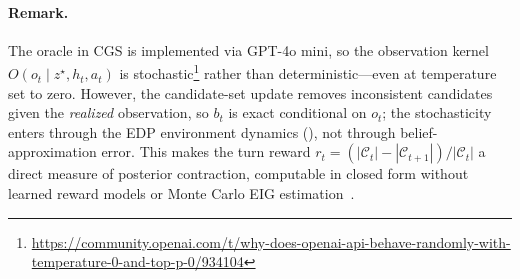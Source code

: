 \documentclass[11pt]{article}
\theoremstyle{plain}
\theoremstyle{definition}
\theoremstyle{remark}
\begin{document}
\paragraph{Remark.}
The oracle in CGS is implemented via GPT-4o mini, so the observation
kernel $O(o_t \mid z^\star, h_t, a_t)$ is stochastic\footnote{\href{https://community.openai.com/t/why-does-openai-api-behave-randomly-with-temperature-0-and-top-p-0/934104}{https://community.openai.com/t/why-does-openai-api-behave-randomly-with-temperature-0-and-top-p-0/934104}} rather than
deterministic—even at temperature set to zero. However, the candidate-set update removes
inconsistent candidates given the \emph{realized} observation, so
$b_t$ is exact conditional on $o_t$; the stochasticity enters
through the EDP environment dynamics
(), not through belief-approximation error.
This makes the turn reward
$r_t = (|\mathcal{C}_t| - |\mathcal{C}_{t+1}|)/|\mathcal{C}_t|$
a direct measure of posterior contraction, computable in closed
form without learned reward models or Monte Carlo EIG
estimation~\citep{choudhury2025bed}.
 
\end{document}
